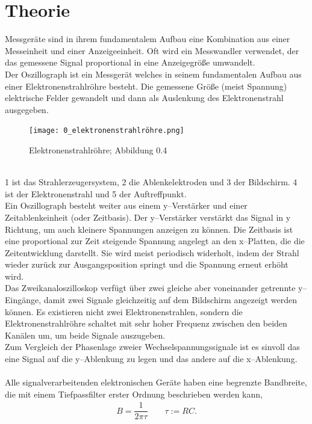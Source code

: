 \documentclass[a4paper,10pt]{article}
\numberwithin{equation}{section}
\begin{document}
\section{Theorie}
Messgeräte sind in ihrem fundamentalem Aufbau eine Kombination aus einer Messeinheit und einer Anzeigeeinheit.
Oft wird ein Messwandler verwendet, der das gemessene Signal proportional in eine Anzeigegröße umwandelt.
\\\indent Der Oszillograph ist ein Messgerät welches in seinem fundamentalen Aufbau aus einer Elektronenstrahlröhre besteht.
Die gemessene Größe (meist Spannung) elektrische Felder gewandelt und dann als Auslenkung des Elektronenstrahl ausgegeben.
\begin{figure}[h]
        \centering
        \texttt{[image: 0\_elektronenstrahlröhre.png]}
        \caption{Elektronenstrahlröhre; Abbildung 0.4 \cite{Praktikumsanleitung}}
\end{figure}\\
1 ist das Strahlerzeugersystem, 2 die Ablenkelektroden und 3 der Bildschirm. 4 ist der Elektronenstrahl und 5 der Auftreffpunkt.
\\\indent Ein Oszillograph besteht weiter aus einem y--Verstärker und einer Zeitablenkeinheit (oder Zeitbasis).
Der y--Verstärker verstärkt das Signal in y Richtung, um auch kleinere Spannungen anzeigen zu können.
Die Zeitbasis ist eine proportional zur Zeit steigende Spannung angelegt an den x--Platten, die die Zeitentwicklung darstellt.
Sie wird meist periodisch widerholt, indem der Strahl wieder zurück zur Ausgangsposition springt und die Spannung erneut erhöht wird.
\\\indent Das Zweikanaloszilloskop verfügt über zwei gleiche aber voneinander getrennte y--Eingänge, damit zwei Signale gleichzeitig auf dem Bildschirm angezeigt werden können.
Es existieren nicht zwei Elektronenstrahlen, sondern die Elektronenstrahlröhre schaltet mit sehr hoher Frequenz zwischen den beiden Kanälen um, um beide Signale auszugeben.
\\\indent Zum Vergleich der Phasenlage zweier Wechselspannungssignale ist es sinvoll das eine Signal auf die y--Ablenkung zu legen und das andere auf die x--Ablenkung.
\\\\
Alle signalverarbeitenden elektronischen Geräte haben eine begrenzte Bandbreite, die mit einem Tiefpassfilter erster Ordnung beschrieben werden kann,
\begin{align} 
        B=\dfrac{1}{2\pi \tau }\qquad \tau :=RC
.\end{align} 
\end{document}
